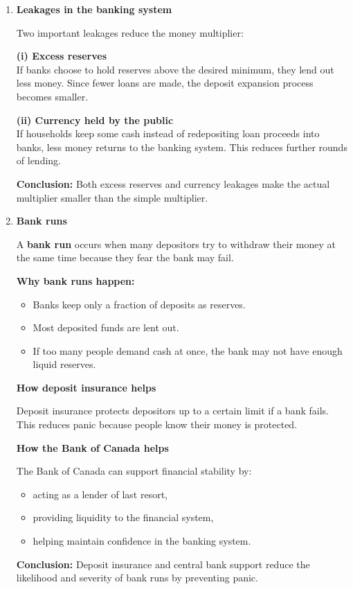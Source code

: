 \documentclass[12pt]{article}
\begin{document}
\begin{enumerate}[label=\textbf{\arabic*.}, start=4]
\item \textbf{Leakages in the banking system}

Two important leakages reduce the money multiplier:

\textbf{(i) Excess reserves}\\
If banks choose to hold reserves above the desired minimum, they lend out less money. Since fewer loans are made, the deposit expansion process becomes smaller.

\textbf{(ii) Currency held by the public}\\
If households keep some cash instead of redepositing loan proceeds into banks, less money returns to the banking system. This reduces further rounds of lending.

\textbf{Conclusion:}
Both excess reserves and currency leakages make the actual multiplier smaller than the simple multiplier.

\item \textbf{Bank runs}

A \textbf{bank run} occurs when many depositors try to withdraw their money at the same time because they fear the bank may fail.

\textbf{Why bank runs happen:}
\begin{itemize}
    \item Banks keep only a fraction of deposits as reserves.
    \item Most deposited funds are lent out.
    \item If too many people demand cash at once, the bank may not have enough liquid reserves.
\end{itemize}

\textbf{How deposit insurance helps}

Deposit insurance protects depositors up to a certain limit if a bank fails. This reduces panic because people know their money is protected.

\textbf{How the Bank of Canada helps}

The Bank of Canada can support financial stability by:
\begin{itemize}
    \item acting as a lender of last resort,
    \item providing liquidity to the financial system,
    \item helping maintain confidence in the banking system.
\end{itemize}

\textbf{Conclusion:} Deposit insurance and central bank support reduce the likelihood and severity of bank runs by preventing panic.

\end{enumerate}
\end{document}
